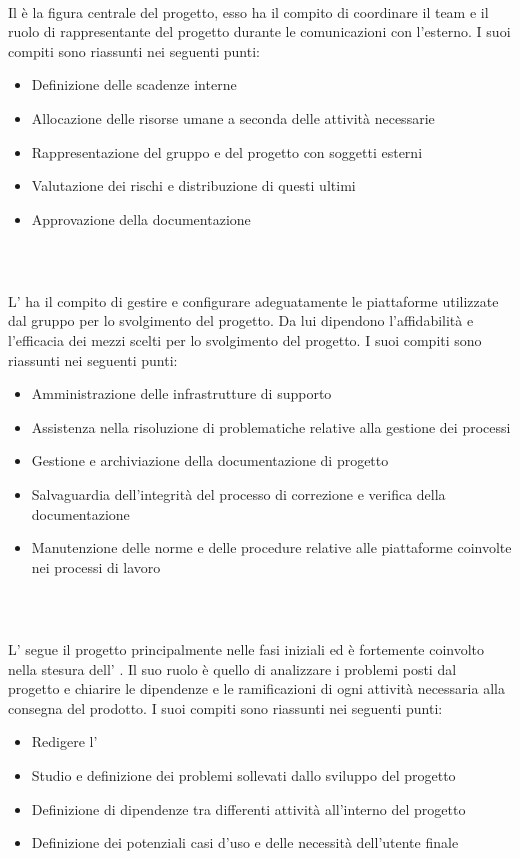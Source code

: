 \subparagraph{\RdP{}}\mbox{}\\
\mbox{}\\
Il \RdP{} è la figura centrale del progetto, esso ha il compito di coordinare il team e il ruolo di rappresentante del progetto durante le comunicazioni con l'esterno. I suoi compiti sono riassunti nei seguenti punti:
\begin{itemize}
\item Definizione delle scadenze interne
\item Allocazione delle risorse umane a seconda delle attività necessarie
\item Rappresentazione del gruppo e del progetto con soggetti esterni
\item Valutazione dei rischi e distribuzione di questi ultimi
\item Approvazione della documentazione
\end{itemize}

\subparagraph{\adm{}}\mbox{}\\
\mbox{}\\
L'\adm{} ha il compito di gestire e configurare adeguatamente le piattaforme utilizzate dal gruppo per lo svolgimento del progetto. Da lui dipendono l'affidabilità e l'efficacia dei mezzi scelti per lo svolgimento del progetto.
I suoi compiti sono riassunti nei seguenti punti:
\begin{itemize}
\item Amministrazione delle infrastrutture di supporto
\item Assistenza nella risoluzione di problematiche relative alla gestione dei processi
\item Gestione e archiviazione della documentazione di progetto
\item Salvaguardia dell'integrità del processo di correzione e verifica della documentazione
\item Manutenzione delle norme e delle procedure relative alle piattaforme coinvolte nei processi di lavoro
\end{itemize}

\subparagraph{\ana{}}\mbox{}\\
\mbox{}\\
L' \ana{} segue il progetto principalmente nelle fasi iniziali ed è fortemente coinvolto nella stesura dell' \AdR{}. Il suo ruolo è quello di analizzare i problemi posti dal progetto e chiarire le dipendenze e le ramificazioni di ogni attività necessaria alla consegna del prodotto.
I suoi compiti sono riassunti nei seguenti punti:
\begin{itemize}
\item Redigere l'\AdR{}
\item Studio e definizione dei problemi sollevati dallo sviluppo del progetto
\item Definizione di dipendenze tra differenti attività all'interno del progetto
\item Definizione dei potenziali casi d'uso e delle necessità dell'utente finale
\end{itemize}

